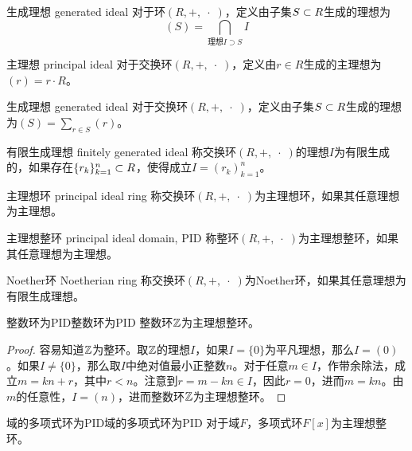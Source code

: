 \begin{definition}{生成理想 generated ideal}
	对于环$(R,+,\;\cdot\;)$，定义由子集$S\subset R$生成的理想为
	$$
	(S)=\bigcap_{\text{理想}I\supset S}I
	$$
\end{definition}

\begin{definition}{主理想 principal ideal}
	对于交换环$(R,+,\;\cdot\;)$，定义由$r\in R$生成的主理想为$(r)=r\cdot R$。
\end{definition}

\begin{definition}{生成理想 generated ideal}
	对于交换环$(R,+,\;\cdot\;)$，定义由子集$S\subset R$生成的理想为$\displaystyle( S )=\sum_{r\in S}(r)$。
\end{definition}

\begin{definition}{有限生成理想 finitely generated ideal}
	称交换环$(R,+,\;\cdot\;)$的理想$I$为有限生成的，如果存在$\{ r_k \}_{k=1}^n\subset R$，使得成立$I=(r_k)_{k=1}^n$。
\end{definition}

\begin{definition}{主理想环 principal ideal ring}
	称交换环$(R,+,\;\cdot\;)$为主理想环，如果其任意理想为主理想。
\end{definition}

\begin{definition}{主理想整环 principal ideal domain, PID}
	称整环$(R,+,\;\cdot\;)$为主理想整环，如果其任意理想为主理想。
\end{definition}

\begin{definition}{Noether环 Noetherian ring}
	称交换环$(R,+,\;\cdot\;)$为Noether环，如果其任意理想为有限生成理想。
\end{definition}

\begin{proposition}{整数环为PID}{整数环为PID}
	整数环$\mathbb{Z}$为主理想整环。
\end{proposition}

\begin{proof}
	容易知道$\mathbb{Z}$为整环。取$\mathbb{Z}$的理想$I$，如果$I=\{0\}$为平凡理想，那么$I=(0)$。如果$I\ne\{0\}$，那么取$I$中绝对值最小正整数$n$。对于任意$m\in I$，作带余除法，成立$m=kn+r$，其中$r<n$。注意到$r=m-kn\in I$，因此$r=0$，进而$m=kn$。由$m$的任意性，$I=(n)$，进而整数环$\mathbb{Z}$为主理想整环。
\end{proof}

\begin{proposition}{域的多项式环为PID}{域的多项式环为PID}
	对于域$F$，多项式环$F[x]$为主理想整环。
\end{proposition}

